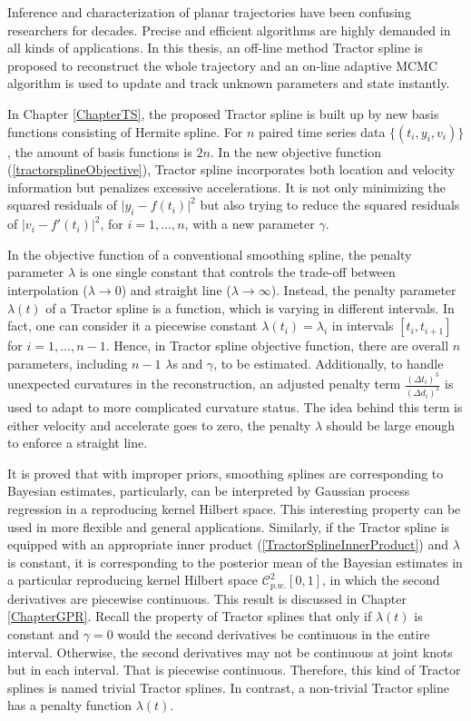 

Inference and characterization of planar trajectories have been confusing researchers for decades. Precise and efficient algorithms are highly demanded in all kinds of applications. In this thesis, an off-line method Tractor spline is proposed to reconstruct the whole trajectory and an on-line adaptive MCMC algorithm is used to update and track unknown parameters and state instantly. 


In Chapter \ref{ChapterTS}, the proposed Tractor spline is built up by new basis functions consisting of Hermite spline. For $n$ paired time series data $\{(t_i,y_i,v_i)\}$, the amount of basis functions is $2n$. In the new objective function (\ref{tractorsplineObjective}), Tractor spline incorporates both location and velocity information but penalizes excessive accelerations. It is not only minimizing the squared residuals of $\lvert y_i-f(t_i)\rvert^2$ but also trying to reduce the squared residuals of $\lvert v_i-f'(t_i)\rvert^2$, for $i=1,\ldots,n$, with a new parameter $\gamma$. 

In the objective function of a conventional smoothing spline, the penalty parameter $\lambda$ is one single constant that controls the trade-off between interpolation ($\lambda\to 0$) and straight line ($\lambda\to \infty$). Instead, the penalty parameter $\lambda(t)$ of a Tractor spline is a function, which is varying in different intervals. In fact, one can consider it a piecewise constant $\lambda(t_i)=\lambda_i$ in intervals $[t_i,t_{i+1}]$ for $i=1,\ldots,n-1$. Hence, in Tractor spline objective function, there are overall $n$ parameters, including $n-1$ $\lambda$s and $\gamma$, to be estimated. Additionally, to handle unexpected curvatures in the reconstruction, an adjusted penalty term $\frac{(\Delta t_i)^3}{(\Delta d_i)^2}$ is used to adapt to more complicated curvature status. The idea behind this term is either velocity and accelerate goes to zero, the penalty $\lambda$ should be large enough to enforce a straight line. 





It is proved that with improper priors, smoothing splines are corresponding to Bayesian estimates, particularly, can be interpreted by Gaussian process regression in a reproducing kernel Hilbert space. This interesting property can be used in more flexible and general applications. Similarly, if the Tractor spline is equipped with an appropriate inner product (\ref{TractorSplineInnerProduct}) and $\lambda$ is constant, it is corresponding to the posterior mean of the Bayesian estimates in a particular reproducing kernel Hilbert space $\mathcal{C}_{p.w.}^2[0,1]$, in which the second derivatives are piecewise continuous. This result is discussed in Chapter \ref{ChapterGPR}. Recall the property of Tractor splines that only if $\lambda(t)$ is constant and $\gamma=0$ would the second derivatives be continuous in the entire interval. Otherwise, the second derivatives may not be continuous at joint knots but in each interval. That is piecewise continuous. Therefore, this kind of Tractor splines is named trivial Tractor splines. In contrast, a non-trivial Tractor spline has a penalty function $\lambda(t)$. 


